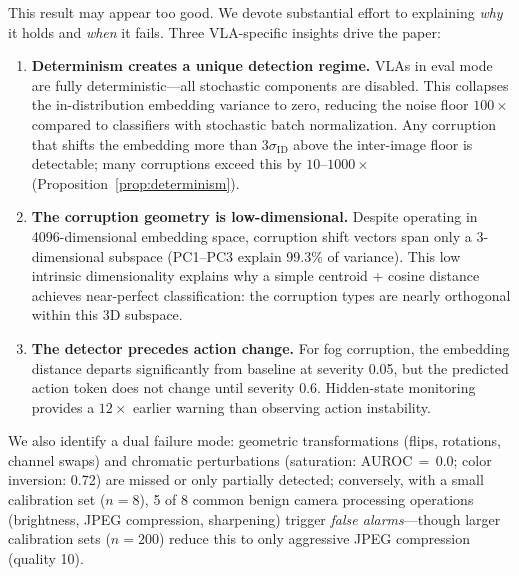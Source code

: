 \documentclass[11pt]{article}
\begin{document}
This result may appear too good.
We devote substantial effort to explaining \emph{why} it holds and \emph{when} it fails.
Three VLA-specific insights drive the paper:

\begin{enumerate}
    \item \textbf{Determinism creates a unique detection regime.}
    VLAs in eval mode are fully deterministic---all stochastic components are disabled.
    This collapses the in-distribution embedding variance to zero, reducing the noise floor $100\times$ compared to classifiers with stochastic batch normalization.
    Any corruption that shifts the embedding more than $3\sigma_\text{ID}$ above the inter-image floor is detectable; many corruptions exceed this by $10$--$1000\times$ (Proposition~\ref{prop:determinism}).

    \item \textbf{The corruption geometry is low-dimensional.}
    Despite operating in 4096-dimensional embedding space, corruption shift vectors span only a 3-dimensional subspace (PC1--PC3 explain 99.3\% of variance).
    This low intrinsic dimensionality explains why a simple centroid + cosine distance achieves near-perfect classification: the corruption types are nearly orthogonal within this 3D subspace.

    \item \textbf{The detector precedes action change.}
    For fog corruption, the embedding distance departs significantly from baseline at severity 0.05, but the predicted action token does not change until severity 0.6.
    Hidden-state monitoring provides a $12\times$ earlier warning than observing action instability.
\end{enumerate}

We also identify a dual failure mode: geometric transformations (flips, rotations, channel swaps) and chromatic perturbations (saturation: AUROC\,$=$\,0.0; color inversion: 0.72) are missed or only partially detected; conversely, with a small calibration set ($n{=}8$), 5 of 8 common benign camera processing operations (brightness, JPEG compression, sharpening) trigger \emph{false alarms}---though larger calibration sets ($n{=}200$) reduce this to only aggressive JPEG compression (quality 10).
\end{document}
